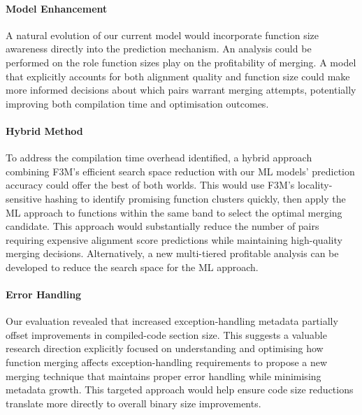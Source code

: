\paragraph{Model Enhancement} A natural evolution of our current model would incorporate function size awareness directly into the prediction mechanism. An analysis could be performed on the role function sizes play on the profitability of merging. A model that explicitly accounts for both alignment quality and function size could make more informed decisions about which pairs warrant merging attempts, potentially improving both compilation time and optimisation outcomes.

\paragraph{Hybrid Method} To address the compilation time overhead identified, a hybrid approach combining F3M's efficient search space reduction with our ML models' prediction accuracy could offer the best of both worlds. This would use F3M's locality-sensitive hashing to identify promising function clusters quickly, then apply the ML approach to functions within the same band to select the optimal merging candidate. This approach would substantially reduce the number of pairs requiring expensive alignment score predictions while maintaining high-quality merging decisions. Alternatively, a new multi-tiered profitable analysis can be developed to reduce the search space for the ML approach.

\paragraph{Error Handling} Our evaluation revealed that increased exception-handling metadata partially offset improvements in compiled-code section size. This suggests a valuable research direction explicitly focused on understanding and optimising how function merging affects exception-handling requirements to propose a new merging technique that maintains proper error handling while minimising metadata growth. This targeted approach would help ensure code size reductions translate more directly to overall binary size improvements.